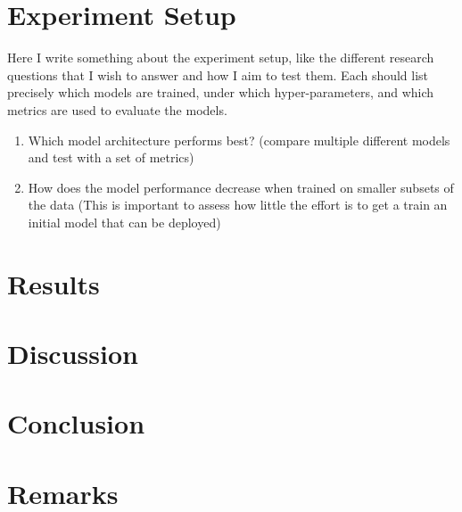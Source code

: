 \documentclass{article}
\begin{document}
  

  \section{Experiment Setup} %
  \label{sec:experiment-setup}

  Here I write something about the experiment setup, like the different
  research questions that I wish to answer and how I aim to test them. Each
  should list precisely which models are trained, under which hyper-parameters,
  and which metrics are used to evaluate the models.

  \begin{enumerate}
    \item Which model architecture performs best? (compare multiple different
      models and test with a set of metrics)
    \item How does the model performance decrease when trained on smaller
      subsets of the data (This is important to assess how little the effort is
      to get a train an initial model that can be deployed)
  \end{enumerate}

  


  \section{Results} %
  \label{sec:results}


  \section{Discussion} %
  \label{sec:discussion}


  \section{Conclusion} %
  \label{sec:conclusion}


  \section{Remarks} %
  \label{sec:remarks}
\end{document}
